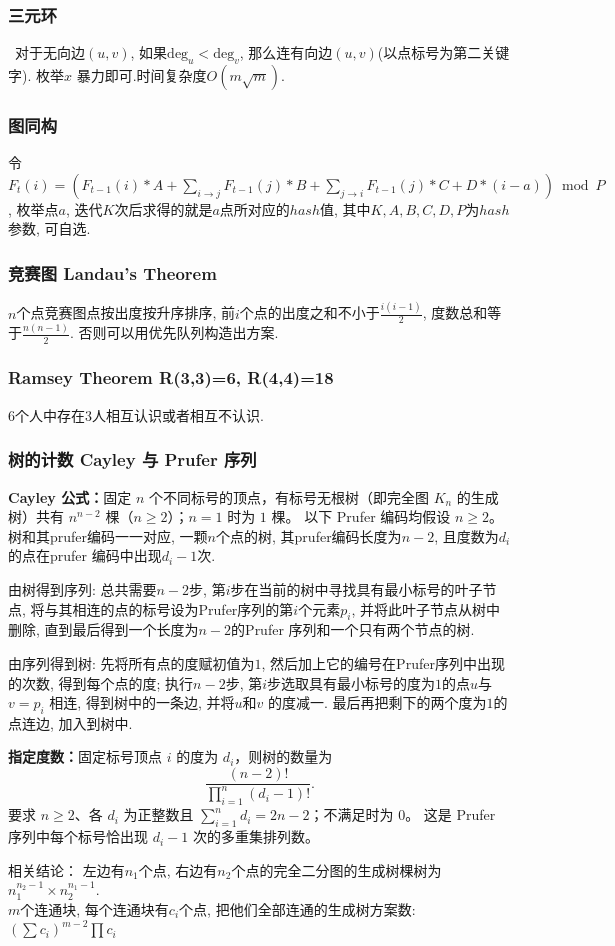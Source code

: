 \subsubsection{三元环}\
			   对于无向边$(u,v)$, 如果$\mathrm{deg}_u<\mathrm{deg}_v$, 那么连有向边$(u,v)$(以点标号为第二关键字). 枚举$x$ 暴力即可.时间复杂度$O(m\sqrt{m})$. 
\subsubsection{图同构}
				令$F_t(i)=(F_{t-1}(i)*A+\sum_{i\to j} F_{t-1}(j)*B+\sum_{j\to i} F_{t-1}(j)*C+D*(i-a)) \bmod P$, 枚举点$a$, 迭代$K$次后求得的就是$a$点所对应的$hash$值, 其中$K,A,B,C,D,P$为$hash$参数, 可自选. 

\subsubsection{竞赛图 Landau's Theorem}
	$n$个点竞赛图点按出度按升序排序, 前$i$个点的出度之和不小于$\frac{i(i-1)}{2}$, 度数总和等于$\frac{n(n-1)}{2}$. 否则可以用优先队列构造出方案.

\subsubsection{Ramsey Theorem R(3,3)=6, R(4,4)=18}
	$6$个人中存在$3$人相互认识或者相互不认识.

\subsubsection{树的计数 Cayley 与 Prufer 序列}
\textbf{Cayley 公式：}固定 $n$ 个不同标号的顶点，有标号无根树（即完全图 $K_n$ 的生成树）共有 $n^{n-2}$ 棵（$n\ge2$）；$n=1$ 时为 $1$ 棵。
以下 Prufer 编码均假设 $n\ge2$。
	树和其prufer编码一一对应, 一颗$n$个点的树, 其prufer编码长度为${n-2}$, 且度数为$d_i$ 的点在prufer 编码中出现${d_i -1}$次. 
	\par 由树得到序列: 总共需要$n-2$步, 第$i$步在当前的树中寻找具有最小标号的叶子节点, 将与其相连的点的标号设为Prufer序列的第$i$个元素$p_i$, 并将此叶子节点从树中删除, 直到最后得到一个长度为$n-2$的Prufer 序列和一个只有两个节点的树. 
	\par 由序列得到树: 先将所有点的度赋初值为$1$, 然后加上它的编号在Prufer序列中出现的次数, 得到每个点的度; 执行$n-2$步, 第$i$步选取具有最小标号的度为$1$的点$u$与$v=p_i$ 相连, 得到树中的一条边, 并将$u$和$v$ 的度减一. 最后再把剩下的两个度为$1$的点连边, 加入到树中. 
	\par \textbf{指定度数：}固定标号顶点 $i$ 的度为 $d_i$，则树的数量为
\[\frac{(n-2)!}{\prod_{i=1}^{n}(d_i-1)!}.\]
要求 $n\ge2$、各 $d_i$ 为正整数且 $\sum_{i=1}^{n}d_i=2n-2$；不满足时为 $0$。
这是 Prufer 序列中每个标号恰出现 $d_i-1$ 次的多重集排列数。
\par 相关结论：
	左边有$n_1$个点, 右边有$n_2$个点的完全二分图的生成树棵树为$n_1^{n_2-1}\times n_2^{n_1-1}$. \\
	$m$个连通块, 每个连通块有$c_i$个点, 把他们全部连通的生成树方案数: $(\sum c_i)^{m-2}\prod c_i$

